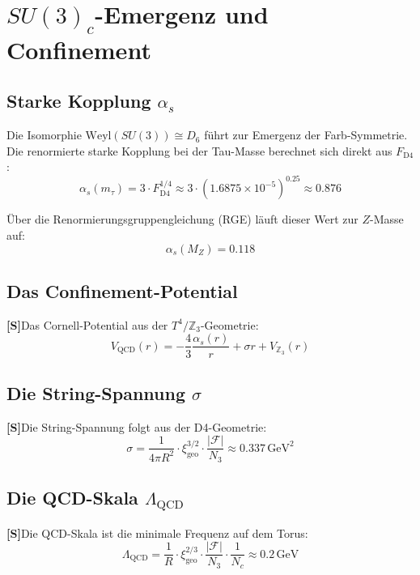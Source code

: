 \documentclass[11pt,a4paper]{article}
\newcommand{\xigeo}{\xi_{\text{geo}}}
\newcommand{\Ffix}{\mathcal{F}}
\newcommand{\Sstatus}{\textbf{[S]}}
\begin{document}
	\section{$SU(3)_c$-Emergenz und Confinement}
	
	\subsection{Starke Kopplung $\alpha_s$}
	
	Die Isomorphie $\text{Weyl}(SU(3)) \cong D_6$ führt zur Emergenz der Farb-Symmetrie. Die renormierte starke Kopplung bei der Tau-Masse berechnet sich direkt aus $F_{\text{D4}}$:
	\begin{equation}
		\alpha_s(m_\tau) = 3 \cdot F_{\text{D4}}^{1/4} \approx 3 \cdot (1.6875 \times 10^{-5})^{0.25} \approx 0.876
	\end{equation}
	
	Über die Renormierungsgruppengleichung (RGE) läuft dieser Wert zur $Z$-Masse auf:
	\begin{equation}
		\alpha_s(M_Z) = 0.118
	\end{equation}
	
	\subsection{Das Confinement-Potential}
	
	\Sstatus Das Cornell-Potential aus der $T^4/\mathbb{Z}_3$-Geometrie:
	\begin{equation}
		V_{\text{QCD}}(r) = -\frac{4}{3} \frac{\alpha_s(r)}{r} + \sigma r + V_{\mathbb{Z}_3}(r)
	\end{equation}
	
	\subsection{Die String-Spannung $\sigma$}
	
	\Sstatus Die String-Spannung folgt aus der D4-Geometrie:
	\begin{equation}
		\sigma = \frac{1}{4\pi R^2} \cdot \xigeo^{3/2} \cdot \frac{|\Ffix|}{N_3} \approx 0.337\,\text{GeV}^2
	\end{equation}
	
	\subsection{Die QCD-Skala $\Lambda_{\text{QCD}}$}
	
	\Sstatus Die QCD-Skala ist die minimale Frequenz auf dem Torus:
	\begin{equation}
		\Lambda_{\text{QCD}} = \frac{1}{R} \cdot \xigeo^{2/3} \cdot \frac{|\Ffix|}{N_3} \cdot \frac{1}{N_c} \approx 0.2\,\text{GeV}
	\end{equation}
	
\end{document}
